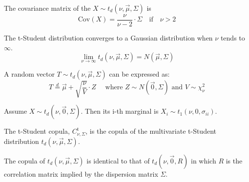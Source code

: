 \documentclass[11pt,fleqn]{book} %
\begin{document}
\begin{proposition}
	The covariance matrix of the $X \sim t_d(\nu,\vec{\mu},\Sigma)$ is
	\begin{displaymath}
		\text{Cov}(X) = \frac{\nu}{\nu-2} \cdot \Sigma \quad \text{if} 
		\quad \nu > 2
	\end{displaymath}
\end{proposition}

\begin{proposition}
	The t-Student distribution converges to a Gaussian distribution 
	when $\nu$ tends to $\infty$.
	\begin{displaymath}
		\lim_{\nu \to \infty} t_d(\nu,\vec{\mu},\Sigma) = N(\vec{\mu},\Sigma)
	\end{displaymath}
\end{proposition}

\begin{proposition}
	\label{prop:mtschar}
	A random vector $T \sim t_d(\nu,\vec{\mu},\Sigma)$ can be expressed as:
	\begin{displaymath}
		T \stackrel{d}{=} \vec{\mu} + \sqrt{\frac{\nu}{V}}\cdot Z
		\quad \text{ where } Z \sim N(\vec{0},\Sigma) 
		\text{ and } V \sim \chi_{\nu}^2
	\end{displaymath}
\end{proposition}

\begin{proposition}
	Assume $X \sim t_d(\nu,\vec{0},\Sigma)$. Then its i-th marginal is 
	$X_i \sim t_1(\nu,0,\sigma_{ii})$.
\end{proposition}

\begin{definition}
	The t-Student copula, $C_{\nu,\Sigma}^{\text{t}}$, is the copula of the 
	multivariate t-Student distribution $t_d(\nu,\vec{\mu},\Sigma)$.
\end{definition}

\begin{proposition}
	The copula of $t_d(\nu,\vec{\mu},\Sigma)$ is identical to that of 
	$t_d(\nu,\vec{0},R)$ in which $R$ is the correlation matrix implied by 
	the dispersion matrix $\Sigma$.
\end{proposition}
\end{document}
